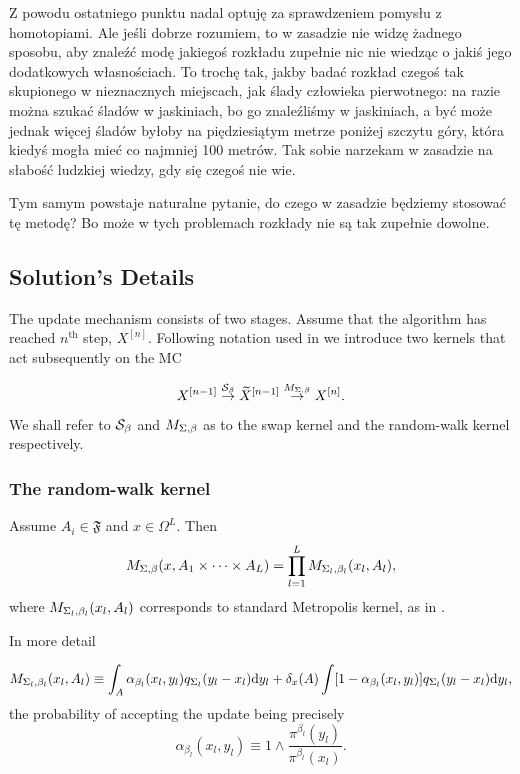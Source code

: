 \begin{questions} 
	\item Z powodu ostatniego punktu nadal optuję za sprawdzeniem pomysłu z homotopiami. Ale jeśli dobrze rozumiem, to w zasadzie nie widzę żadnego sposobu, aby znaleźć modę jakiegoś rozkładu zupełnie nic nie wiedząc o jakiś jego dodatkowych własnościach. To trochę tak, jakby badać rozkład czegoś tak skupionego w nieznacznych miejscach, jak ślady człowieka pierwotnego: na razie można szukać śladów w jaskiniach, bo go znaleźliśmy w jaskiniach, a być może jednak więcej śladów byłoby na piędziesiątym metrze poniżej szczytu góry, która kiedyś mogła mieć co najmniej 100 metrów. Tak sobie narzekam w zasadzie na słabość ludzkiej wiedzy, gdy się czegoś nie wie.
	\item Tym samym powstaje naturalne pytanie, do czego w zasadzie będziemy stosować tę metodę? Bo może w tych problemach rozkłady nie są tak zupełnie dowolne.
\end{questions}




\subsection*{Solution's Details}

	The update mechanism consists of two stages. Assume that the algorithm has reached $n^\text{th}$ step, $X^{[n]}$. Following notation used in \cite{BłażejMiasojedow} we introduce two kernels that act subsequently on the MC
	
	$$X^{[n-1]} \overset{\mathcal{S}_{\beta}}{\rightarrow} \widetilde{X}^{[n-1]} \overset{M_{\Sigma,\beta}}{\rightarrow} X^{[n]}.$$
	
	We shall refer to $\mathcal{S}_{\beta}$ and $M_{\Sigma,\beta}$ as to the swap kernel and the random-walk kernel respectively.

\subsubsection*{The random-walk kernel}
	
Assume $A_i \in \mathfrak{F}$ and $x \in \Omega^L$. Then $$M_{\Sigma,\beta} (x, A_1 \times \dots \times A_L) = \prod_{l=1}^L M_{\Sigma_{l},\beta_{l}}(x_l, A_l),$$
where $M_{\Sigma_{l},\beta_{l}}(x_l, A_l)$ corresponds to standard Metropolis kernel, as in \cite{CharlesJ.Geyer}. 

In more detail 

$$M_{\Sigma_{l},\beta_{l}}(x_l, A_l) \equiv \int_A \alpha_{\beta_l} (x_l, y_l) q_{\Sigma_l} (y_l - x_l) \mathrm{d }y_l + \delta_x (A) \int [1 - \alpha_{\beta_l} (x_l, y_l)] q_{\Sigma_l} (y_l - x_l) \mathrm{d }y_l ,$$
the probability of accepting the update being precisely 
\begin{equation}\label{acceptance prob}
	\alpha_{\beta_l} (x_l, y_l)  \equiv 1 \wedge \frac{\pi^{\beta_l}(y_l)}{\pi^{\beta_l}(x_l)}.
\end{equation}


